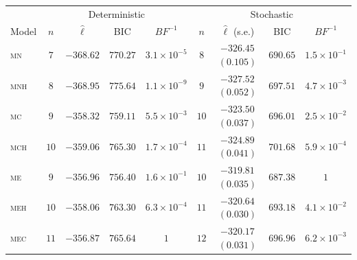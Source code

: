 \begin{table}[h!]
\centering
\small
\begin{tabular}{lcccccccc}
  \toprule
  & \multicolumn{4}{c}{Deterministic} & \multicolumn{4}{c}{Stochastic} \\
    \cmidrule(rl){2-5}\cmidrule(rl){6-9}
  Model & $n$ & $\hat{\ell}$ & BIC & ${BF}^{-1}$ & $n$ & \makecell{$\hat{\ell}$ \vspace{-.1cm} \\ \scriptsize{(s.e.)}}  & BIC  & $BF^{-1}$ \\ 
  \cmidrule(rl){2-5}\cmidrule(rl){6-9}
  \textsc{mn} & $7$ & $-368.62$ & $770.27$ & $3.1\times 10^{-5}$ &   $8$ & \makecell{$-326.45$ \vspace{-.1cm} \\ \scriptsize{$(0.105)$}} & $690.65$ & $1.5\times 10^{-1}$ \\ 
  \textsc{mnh} &  $8$ & $-368.95$ & $775.64$ & $1.1\times 10^{-9}$ &   $9$ & \makecell{$-327.52$\vspace{-.1cm} \\ \scriptsize{$(0.052)$}} & $697.51$ & $4.7\times 10^{-3}$ \\ 
  \textsc{mc} &   $9$ & $-358.32$ & $759.11$ & $5.5\times 10^{-3}$ &  $10$ & \makecell{$-323.50$\vspace{-.1cm} \\ \scriptsize{$(0.037)$}} & $696.01$ & $2.5\times 10^{-2}$ \\ 
  \textsc{mch} &  $10$ & $-359.06$ & $765.30$ & $1.7\times 10^{-4}$ &  $11$ & \makecell{$-324.89$\vspace{-.1cm} \\ \scriptsize{$(0.041)$}} & $701.68$ & $5.9\times 10^{-4}$ \\ 
  \textsc{me} &   $9$ & $-356.96$ & $756.40$ & $1.6\times 10^{-1}$ &  $10$ & \makecell{$-319.81$\vspace{-.1cm} \\ \scriptsize{$(0.035)$}} & $687.38$ & $1$ \\ 
  \textsc{meh} &  $10$ & $-358.06$ & $763.30$ & $6.3\times 10^{-4}$ &  $11$ & \makecell{$-320.64$\vspace{-.1cm} \\ \scriptsize{$(0.030)$}} & $693.18$ & $4.1\times 10^{-2}$ \\ 
  \textsc{mec} &  $11$ & $-356.87$ & $765.64$ & $1$                            &  $12$ & \makecell{$-320.17$\vspace{-.1cm} \\ \scriptsize{$(0.031)$}} & $696.96$ & $6.2\times 10^{-3}$ \\ 

\end{tabular}
\end{table}
